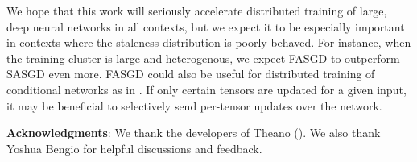 \documentclass{article} %
\begin{document}
We hope that this work will seriously accelerate distributed training of large, deep neural networks in
all contexts,
but we expect it to be especially important in contexts where the staleness distribution is poorly behaved.
For instance, when the training cluster is large and heterogenous, we expect FASGD to outperform SASGD even more.
FASGD could also be useful for distributed training of conditional networks as in \cite{Conditional}.
If only certain tensors are updated for a given input,
it may be beneficial to selectively send per-tensor updates over the network. 

{\bf Acknowledgments}: We thank the developers of Theano (\cite{Theano}).
We also thank Yoshua Bengio for helpful discussions and feedback.

\newpage

\nocite{*}


\end{document}
